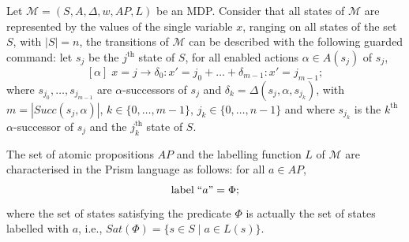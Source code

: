 \begin{example}
Let $\mathcal{M} = (S, A, \Delta, w, AP, L)$ be an MDP. Consider that all states of $\mathcal{M}$ are represented by the values of the single variable $x$, ranging on all states of the set $S$, with $|S|=n$, the transitions of $\mathcal{M}$ can be described with the following guarded command:
let $s_j$ be the $j^{\text{th}}$ state of $S$, for all enabled actions $\alpha \in A(s_j)$ of $s_j$,
\[
  [\alpha] \; x=j \rightarrow \delta_0: x'=j_0 + \dots + \delta_{m-1}:  x'=j_{m-1};
\]
where $s_{j_0}, \dots, s_{j_{m-1}}$ are $\alpha$-successors of $s_j$ and $\delta_k = \Delta(s_j, \alpha, s_{j_k})$,
with  $m=|Succ(s_j,\alpha)|$, $k \in \{0, \dots, m-1\}$, $j_k \in \{0, \dots, n-1\}$ and where $s_{j_k}$ is the $k^\text{th}$ $\alpha$-successor of $s_j$ and the $j_k^\text{th}$ state of $S$.
\end{example}

The set of atomic propositions $AP$ and the labelling function $L$ of $\mathcal{M}$ are characterised in the Prism language as follows: for all $a \in AP$,
\[
  \text{label} \; ``a" = \Phi;
\]
where the set of states satisfying the predicate $\Phi$ is actually the set of states labelled with $a$, i.e., $Sat(\Phi) = \{ s \in S \; | \; a \in L(s) \}$. \\

%

